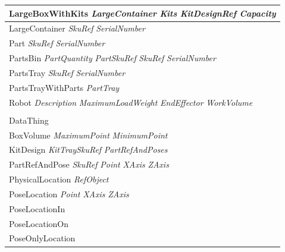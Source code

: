 \documentclass[preprint,12pt]{elsarticle}
\newcommand{\class}[1] {\textsf{#1}}
\begin{document}
\begin{table}[!h!t]
{\begin{tabular}{l}
\\\midrule
\hspace{5 mm}\class{LargeBoxWithKits} \textit{LargeContainer} \textit{Kits} \textit{KitDesignRef} \textit{Capacity}
\\\midrule
\hspace{5 mm}\class{LargeContainer} \textit{SkuRef} \textit{SerialNumber}
\\\midrule
\hspace{5 mm}\class{Part} \textit{SkuRef} \textit{SerialNumber}
\\\midrule
\hspace{5 mm}\class{PartsBin} \textit{PartQuantity} \textit{PartSkuRef} \textit{SkuRef} \textit{SerialNumber}
\\\midrule
\hspace{5 mm}\class{PartsTray} \textit{SkuRef} \textit{SerialNumber}
\\\midrule
\hspace{5 mm}\class{PartsTrayWithParts} \textit{PartTray}
\\\midrule
\hspace{5 mm}\class{Robot} \textit{Description} \textit{MaximumLoadWeight} \textit{EndEffector} \textit{WorkVolume}
\\\midrule
\hspace{5 mm}
\\\midrule
\class{DataThing}
\\\midrule
\hspace{5 mm}\class{BoxVolume} \textit{MaximumPoint} \textit{MinimumPoint}
\\\midrule
\hspace{5 mm}\class{KitDesign} \textit{KitTraySkuRef} \textit{PartRefAndPoses}
\\\midrule
\hspace{5 mm}\class{PartRefAndPose} \textit{SkuRef} \textit{Point} \textit{XAxis} \textit{ZAxis}
\\\midrule
\hspace{5 mm}\class{PhysicalLocation} \textit{RefObject}
\\\midrule
\hspace{10 mm}\class{PoseLocation} \textit{Point} \textit{XAxis} \textit{ZAxis}
\\\midrule
\hspace{15 mm}\class{PoseLocationIn}
\\\midrule
\hspace{15 mm}\class{PoseLocationOn}
\\\midrule
\hspace{15 mm}\class{PoseOnlyLocation}

\end{tabular}}
\end{table}
\end{document}

